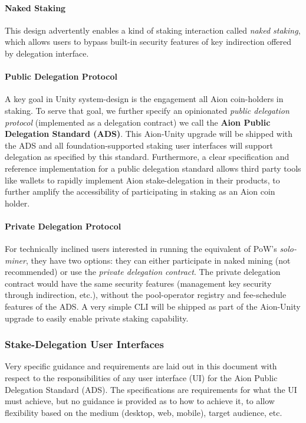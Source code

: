 \paragraph{Naked Staking}

This design advertently enables a kind of staking interaction called \textit{naked staking}, which allows users to bypass built-in security features of key indirection offered by delegation interface. 

\paragraph{Public Delegation Protocol}
A key goal in Unity system-design is the engagement all Aion coin-holders in staking. To serve that goal, we further specify an opinionated \textit{public delegation protocol} (implemented as a delegation contract) we call the \textbf{Aion Public Delegation Standard (ADS)}. This Aion-Unity upgrade will be shipped with the ADS and all foundation-supported staking user interfaces will support delegation as specified by this standard. Furthermore, a clear specification and reference implementation for a public delegation standard allows third party tools like wallets to rapidly implement Aion stake-delegation in their products, to further amplify the accessibility of participating in staking as an Aion coin holder. 

\paragraph{Private Delegation Protocol}
For technically inclined users interested in running the equivalent of PoW's \textit{solo-miner}, they have two options: they can either participate in naked mining (not recommended) or use the \textit{private delegation contract}. The private delegation contract would have the same security features (management key security through indirection, etc.), without the pool-operator registry and fee-schedule features of the ADS. A very simple CLI will be shipped as part of the Aion-Unity upgrade to easily enable private staking capability. 

\subsubsection{Stake-Delegation User Interfaces}
Very specific guidance and requirements are laid out in this document with respect to the responsibilities of any user interface (UI) for the Aion Public Delegation Standard (ADS). The specifications are requirements for what the UI must achieve, but no guidance is provided as to how to achieve it, to allow flexibility based on the medium (desktop, web, mobile), target audience, etc. 


